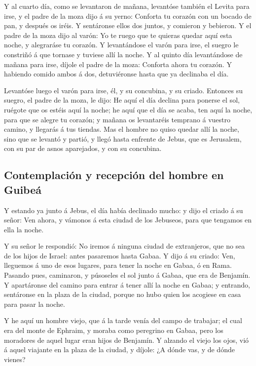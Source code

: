  Y al cuarto día, como se levantaron de mañana, levantóse
también el Levita para irse, y el padre de la moza dijo á su yerno:
Conforta tu corazón con un bocado de pan, y después os iréis.
 Y sentáronse ellos dos juntos, y comieron y bebieron. Y el
padre de la moza dijo al varón: Yo te ruego que te quieras quedar aquí
esta noche, y alegraráse tu corazón.  Y levantándose el
varón para irse, el suegro le constriñó á que tornase y tuviese allí la
noche.  Y al quinto día levantándose de mañana para irse,
díjole el padre de la moza: Conforta ahora tu corazón. Y habiendo comido
ambos á dos, detuviéronse hasta que ya declinaba el día.

 Levantóse luego el varón para irse, él, y su concubina, y
su criado. Entonces su suegro, el padre de la moza, le dijo: He aquí el
día declina para ponerse el sol, ruégote que os estéis aquí la noche; he
aquí que el día se acaba, ten aquí la noche, para que se alegre tu
corazón; y mañana os levantaréis temprano á vuestro camino, y llegarás á
tus tiendas.  Mas el hombre no quiso quedar allí la noche,
sino que se levantó y partió, y llegó hasta enfrente de Jebus, que es
Jerusalem, con su par de asnos aparejados, y con su concubina.

\hypertarget{contemplaciuxf3n-y-recepciuxf3n-del-hombre-en-guibeuxe1}{%
\subsection{Contemplación y recepción del hombre en
Guibeá}\label{contemplaciuxf3n-y-recepciuxf3n-del-hombre-en-guibeuxe1}}

 Y estando ya junto á Jebus, el día había declinado mucho:
y dijo el criado á su señor: Ven ahora, y vámonos á esta ciudad de los
Jebuseos, para que tengamos en ella la noche.

 Y su señor le respondió: No iremos á ninguna ciudad de
extranjeros, que no sea de los hijos de Israel: antes pasaremos hasta
Gabaa. Y dijo á su criado:  Ven, lleguemos á uno de esos
lugares, para tener la noche en Gabaa, ó en Rama.  Pasando
pues, caminaron, y púsoseles el sol junto á Gabaa, que era de Benjamín.
 Y apartáronse del camino para entrar á tener allí la noche
en Gabaa; y entrando, sentáronse en la plaza de la ciudad, porque no
hubo quien los acogiese en casa para pasar la noche.

 Y he aquí un hombre viejo, que á la tarde venía del campo
de trabajar; el cual era del monte de Ephraim, y moraba como peregrino
en Gabaa, pero los moradores de aquel lugar eran hijos de Benjamín.
 Y alzando el viejo los ojos, vió á aquel viajante en la
plaza de la ciudad, y díjole: ¿A dónde vas, y de dónde vienes?

